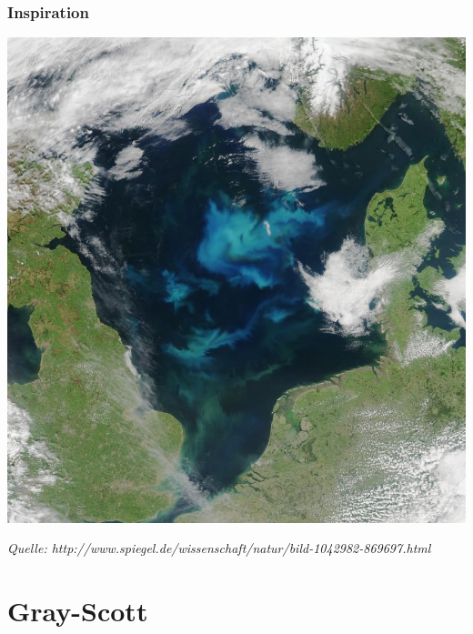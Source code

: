 \documentclass[12pt]{beamer}
\begin{document}
    
    \begin{frame}
    \begin{center}
    \frametitle{Inspiration}
    \includegraphics[scale=0.15]{Bilder/seaweed.jpg}
    
    {\tiny \textit{Quelle: http://www.spiegel.de/wissenschaft/natur/bild-1042982-869697.html}}
    \end{center}
    \end{frame}
    

    \section{Gray-Scott}
    
\end{document}
